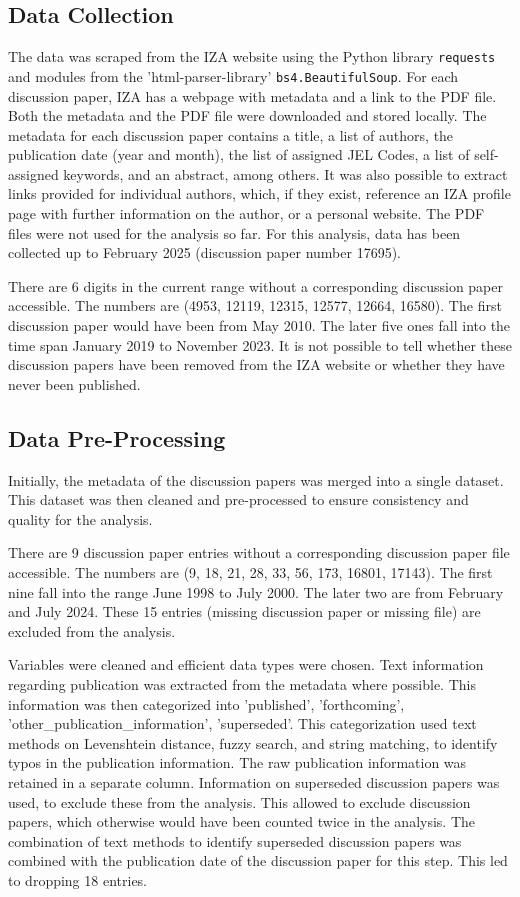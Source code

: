 \documentclass[11pt, a4paper, leqno]{article}
\begin{document}
\subsection{Data Collection}
The data was scraped from the IZA website using the Python library \texttt{requests} and modules from the 'html-parser-library' \texttt{bs4.BeautifulSoup}.
For each discussion paper, IZA has a webpage with metadata and a link to the PDF file.
Both the metadata and the PDF file were downloaded and stored locally.
The metadata for each discussion paper contains a title, a list of authors, the publication date (year and month), the list of assigned JEL Codes, a list of self-assigned keywords, and an abstract, among others.
It was also possible to extract links provided for individual authors, which, if they exist, reference an IZA profile page with further information on the author, or a personal website.
The PDF files were not used for the analysis so far.
For this analysis, data has been collected up to February 2025 (discussion paper number 17695).

There are 6 digits in the current range without a corresponding discussion paper accessible.
The numbers are (4953, 12119, 12315, 12577, 12664, 16580).
The first discussion paper would have been from May 2010.
The later five ones fall into the time span January 2019 to November 2023.
It is not possible to tell whether these discussion papers have been removed from the IZA website or whether they have never been published.

\subsection{Data Pre-Processing}
Initially, the metadata of the discussion papers was merged into a single dataset.
This dataset was then cleaned and pre-processed to ensure consistency and quality for the analysis.

There are 9 discussion paper entries without a corresponding discussion paper file accessible.
The numbers are (9, 18, 21, 28, 33, 56, 173, 16801, 17143).
The first nine fall into the range June 1998 to July 2000.
The later two are from February and July 2024.
These 15 entries (missing discussion paper or missing file) are excluded from the analysis.

Variables were cleaned and efficient data types were chosen.
Text information regarding publication was extracted from the metadata where possible.
This information was then categorized into 'published', 'forthcoming', 'other\_publication\_information', 'superseded'.
This categorization used text methods on Levenshtein distance, fuzzy search, and string matching, to identify typos in the publication information.
The raw publication information was retained in a separate column.
Information on superseded discussion papers was used, to exclude these from the analysis.
This allowed to exclude discussion papers, which otherwise would have been counted twice in the analysis.
The combination of text methods to identify superseded discussion papers was combined with the publication date of the discussion paper for this step.
This led to dropping 18 entries.
\end{document}
